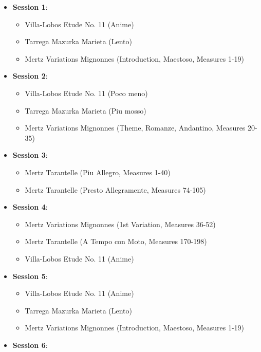 \documentclass{article}
\begin{document}
\begin{itemize}
    \item \textbf{Session 1}: 
        \begin{itemize}
            \item Villa-Lobos Etude No. 11 (Anime)
            \item Tarrega Mazurka Marieta (Lento)
            \item Mertz Variations Mignonnes (Introduction, Maestoso, Measures 1-19)
        \end{itemize}
    \item \textbf{Session 2}:
        \begin{itemize}
            \item Villa-Lobos Etude No. 11 (Poco meno)
            \item Tarrega Mazurka Marieta (Piu mosso)
            \item Mertz Variations Mignonnes (Theme, Romanze, Andantino, Measures 20-35)
        \end{itemize}
    \item \textbf{Session 3}: 
        \begin{itemize}
            \item Mertz Tarantelle (Piu Allegro, Measures 1-40)
            \item Mertz Tarantelle (Presto Allegramente, Measures 74-105)
        \end{itemize}
    \item \textbf{Session 4}: 
        \begin{itemize}
            \item Mertz Variations Mignonnes (1st Variation, Measures 36-52)
            \item Mertz Tarantelle (A Tempo con Moto, Measures 170-198)
            \item Villa-Lobos Etude No. 11 (Anime)
        \end{itemize}
    \item \textbf{Session 5}: 
        \begin{itemize}
            \item Villa-Lobos Etude No. 11 (Anime)
            \item Tarrega Mazurka Marieta (Lento)
            \item Mertz Variations Mignonnes (Introduction, Maestoso, Measures 1-19)
        \end{itemize}
    \item \textbf{Session 6}: 
        \begin{itemize}

\end{itemize}
\end{itemize}
\end{document}
